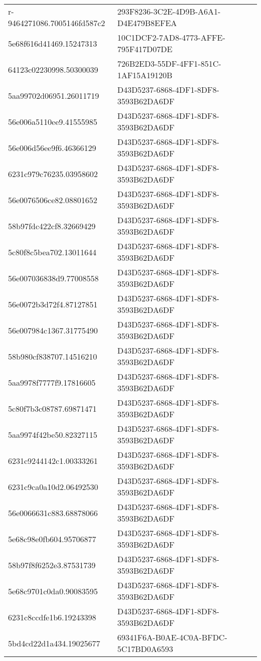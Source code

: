 \begin{tabular}{ll}
r-9464271086.7005146fd587c2 & 293F8236-3C2E-4D9B-A6A1-D4E479B8EFEA \\
5e68f616d41469.15247313 & 10C1DCF2-7AD8-4773-AFFE-795F417D07DE \\
64123c02230998.50300039 & 726B2ED3-55DF-4FF1-851C-1AF15A19120B \\
5aa99702d06951.26011719 & D43D5237-6868-4DF1-8DF8-3593B62DA6DF \\
56e006a5110ee9.41555985 & D43D5237-6868-4DF1-8DF8-3593B62DA6DF \\
56e006d56ee9f6.46366129 & D43D5237-6868-4DF1-8DF8-3593B62DA6DF \\
6231c979c76235.03958602 & D43D5237-6868-4DF1-8DF8-3593B62DA6DF \\
56e0076506ce82.08801652 & D43D5237-6868-4DF1-8DF8-3593B62DA6DF \\
58b97fdc422cf8.32669429 & D43D5237-6868-4DF1-8DF8-3593B62DA6DF \\
5c80f8c5bea702.13011644 & D43D5237-6868-4DF1-8DF8-3593B62DA6DF \\
56e007036838d9.77008558 & D43D5237-6868-4DF1-8DF8-3593B62DA6DF \\
56e0072b3d72f4.87127851 & D43D5237-6868-4DF1-8DF8-3593B62DA6DF \\
56e007984c1367.31775490 & D43D5237-6868-4DF1-8DF8-3593B62DA6DF \\
58b980cf838707.14516210 & D43D5237-6868-4DF1-8DF8-3593B62DA6DF \\
5aa9978f7777f9.17816605 & D43D5237-6868-4DF1-8DF8-3593B62DA6DF \\
5c80f7b3c08787.69871471 & D43D5237-6868-4DF1-8DF8-3593B62DA6DF \\
5aa9974f42be50.82327115 & D43D5237-6868-4DF1-8DF8-3593B62DA6DF \\
6231c9244142c1.00333261 & D43D5237-6868-4DF1-8DF8-3593B62DA6DF \\
6231c9ca0a10d2.06492530 & D43D5237-6868-4DF1-8DF8-3593B62DA6DF \\
56e0066631c883.68878066 & D43D5237-6868-4DF1-8DF8-3593B62DA6DF \\
5e68c98e0fb604.95706877 & D43D5237-6868-4DF1-8DF8-3593B62DA6DF \\
58b97f8f6252e3.87531739 & D43D5237-6868-4DF1-8DF8-3593B62DA6DF \\
5e68c9701c0da0.90083595 & D43D5237-6868-4DF1-8DF8-3593B62DA6DF \\
6231c8ccdfe1b6.19243398 & D43D5237-6868-4DF1-8DF8-3593B62DA6DF \\
5bd4cd22d1a434.19025677 & 69341F6A-B0AE-4C0A-BFDC-5C17BD0A6593 \\

\end{tabular}
